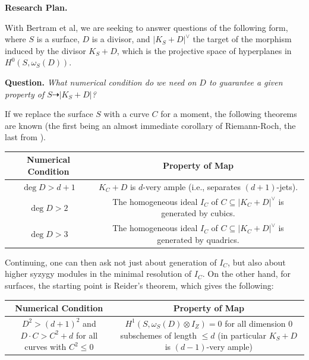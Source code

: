 \documentclass[12pt]{article}
\begin{document}
\textbf{\large Research Plan.}

With Bertram et al, we are seeking to answer questions of the following form, where $S$ is a surface, $D$ is a divisor, and $|K_S+D|^\vee$ the target of the morphism induced by the divisor $K_S+D$, which is the projective space of hyperplanes in $H^0(S,\omega_S(D))$.

\textbf{Question.} \textit{What numerical condition do we need on $D$ to guarantee a given property of $S\dashrightarrow |K_S+D|$?}

If we replace the surface $S$ with a curve $C$ for a moment, the following theorems are known (the first being an almost immediate corollary of Riemann-Roch, the last from \cite{Saint-Donat_1972}).

\begin{center}\renewcommand{\arraystretch}{1.2}
    \begin{tabular}{c|c}
        Numerical Condition & Property of Map\\\hline
        $\deg D > d+1$ & $K_C+D$ is $d$-very ample (i.e., separates $(d+1)$-jets).\\\hline
        $\deg D > 2$ & The homogeneous ideal $I_C$ of $C\subseteq |K_C+D|^\vee$ is generated by cubics.\\\hline
        $\deg D > 3$ & The homogeneous ideal $I_C$ of $C\subseteq |K_C+D|^\vee$ is generated by quadrics.
    \end{tabular}
\end{center}
\smallskip

Continuing, one can then ask not just about generation of $I_C$, but also about higher syzygy modules in the minimal resolution of $I_C$. On the other hand, for surfaces, the starting point is Reider's theorem, which gives the following:\vspace{-10pt}
\begin{center}\renewcommand{\arraystretch}{1.2}
    \begin{tabular}{c|c}
        Numerical Condition & Property of Map\\\hline
        \begin{minipage}{0.35\textwidth}\vspace{5pt}
            $D^2 > (d+1)^2$ and $D\cdot C> C^2+d$ for all curves with $C^2 \leq 0$
        \end{minipage} & \begin{minipage}{0.65\textwidth}\vspace{5pt}
            $H^1(S,\omega_S(D)\otimes I_Z)=0$ for all dimension 0 subschemes of length $\leq d$ (in particular $K_S+D$ is $(d-1)$-very ample)
        \end{minipage}
    \end{tabular}
\end{center}
\smallskip
\end{document}
